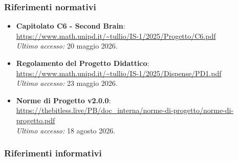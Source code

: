 \documentclass[a4paper, 10pt]{article}
\begin{document}
\subsubsection{Riferimenti normativi}
\label{sec:riferimenti-normativi}
\begin{itemize}
    \item \textbf{Capitolato C6 - Second Brain}: \\
    \url{https://www.math.unipd.it/~tullio/IS-1/2025/Progetto/C6.pdf} \\
    \textit{Ultimo accesso:} 20 maggio 2026.

    \item \textbf{Regolamento del Progetto Didattico}: \\
    \url{https://www.math.unipd.it/~tullio/IS-1/2025/Dispense/PD1.pdf} \\
    \textit{Ultimo accesso:} 23 maggio 2026.

    \item \textbf{Norme di Progetto v2.0.0}: \\
    \url{https://thebitless.live/PB/doc_interna/norme-di-progetto/norme-di-progetto.pdf} \\
    \textit{Ultimo accesso:} 18 agosto 2026.
\end{itemize}

\subsubsection{Riferimenti informativi}
\label{sec:riferimenti-informativi}
\end{document}
